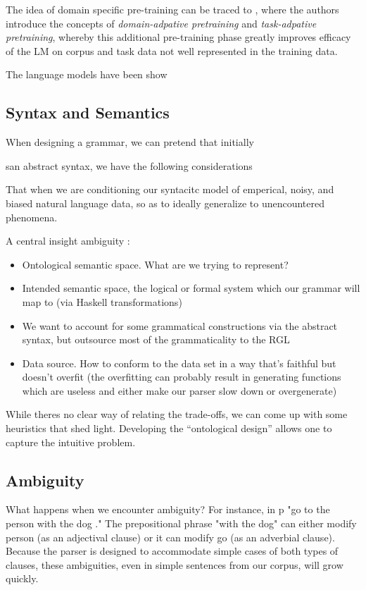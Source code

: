 \documentclass{article}
\begin{document}
The idea of domain specific pre-training can be traced to
\cite{gururangan-etal-2020-dont}, where the authors introduce the concepts of
\emph{domain-adpative pretraining} and \emph{task-adpative pretraining}, whereby
this additional pre-training phase greatly improves efficacy of the LM on
corpus and task data not well represented in the training data.

The language models have been show \cite{bioBert}


\subsection{Syntax and Semantics}

When designing a grammar, we can pretend that initially

san abstract syntax, we have the following considerations

That when we are conditioning our syntacitc model of emperical, noisy, and
biased natural language data, so as to ideally generalize to unencountered
phenomena.

A central insight ambiguity :


\begin{itemize}
\item Ontological semantic space. What are we trying to represent?
\item Intended semantic space, the logical or formal system which our grammar
  will map to (via Haskell transformations)
\item  We want to account for some grammatical constructions via the abstract syntax, but
  outsource most of the grammaticality to the RGL
\item Data source. How to conform to the data set in a way that's faithful but
  doesn't overfit (the overfitting can probably result in generating functions
  which are useless and either make our parser slow down or overgenerate)
\end{itemize}

While theres no clear way of relating the trade-offs, we can come up with some
heuristics that shed light. Developing the ``ontological design'' allows one to
capture the intuitive problem.


\subsection{Ambiguity}

What happens when we encounter ambiguity? For instance, in p "go to the person
with the dog ." The prepositional phrase "with the dog" can either modify person
(as an adjectival clause) or it can modify go (as an adverbial clause). Because
the parser is designed to accommodate simple cases of both types of clauses,
these ambiguities, even in simple sentences from our corpus, will grow quickly.
\end{document}
